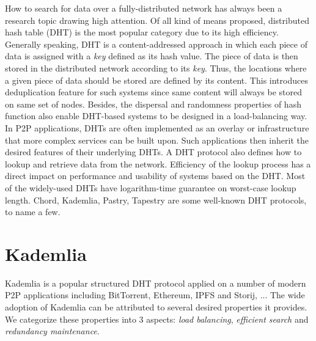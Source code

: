 How to search for data over a fully-distributed network has always been a research topic drawing high attention. Of all kind of means proposed, distributed hash table (DHT) is the most popular category due to its high efficiency. Generally speaking, DHT is a content-addressed approach in which each piece of data is assigned with a \textit{key} defined as its hash value. The piece of data is then stored in the distributed network according to its \textit{key}. Thus, the locations where a given piece of data should be stored are defined by its content. This introduces deduplication feature for such systems since same content will always be stored on same set of nodes. Besides, the dispersal and randomness properties of hash function also enable DHT-based systems to be designed in a load-balancing way. In P2P applications, DHTs are often implemented as an overlay or infrastructure that more complex services can be built upon. Such applications then inherit the desired features of their underlying DHTs. A DHT protocol also defines how to lookup and retrieve data from the network. Efficiency of the lookup process has a direct impact on performance and usability of systems based on the DHT. Most of the widely-used DHTs have logarithm-time guarantee on worst-case lookup length. Chord\cite{stoica2001chord}, Kademlia\cite{maymounkov2002kademlia}, Pastry\cite{rowstron2001pastry}, Tapestry\cite{zhao2004tapestry} are some well-known DHT protocols, to name a few.

\section{Kademlia}
\label{s:kademlia}
Kademlia\cite{maymounkov2002kademlia} is a popular structured DHT protocol applied on a number of modern P2P applications including BitTorrent\cite{bittorrent}, Ethereum\cite{ethereum}, IPFS\cite{ipfs} and Storij\cite{storij}, ... The wide adoption of Kademlia can be attributed to several desired properties it provides. We categorize these properties into 3 aspects: \textit{load balancing}, \textit{efficient search} and \textit{redundancy maintenance}.

